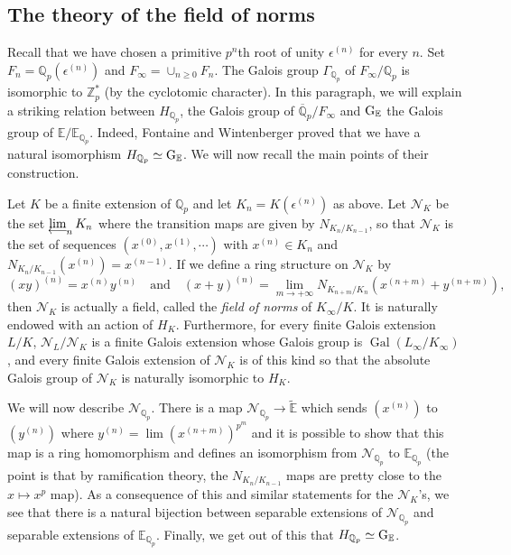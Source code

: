 \documentclass[11pt]{amsart}
\def\limproj{\mathop{\oalign{{\rm lim}\cr 
\hidewidth$\longleftarrow$\hidewidth\cr}}}
\def\Z{{\mathbb Z}_p}
\def\Q{{\mathbb Q}_p}
\def\ra{\rightarrow}
\def\Qp{{\mathbb Q}_p}
\def\ee{\mathbb{E}}
\def\ge{{\rm G}_{\ee}}
\def\et{\widetilde{\mathbb{E}}}
\def\on{\operatorname}
\begin{document}
\subsection{The theory of the field of norms} 
Recall that we have chosen a primitive $p^n$th root of unity 
$\epsilon^{(n)}$ for every $n$. Set $F_n=\Q(\epsilon^{(n)})$ and $F_{\infty} = 
\cup_{n \geq 0} F_n$. The Galois group $\Gamma_{\Q}$ of 
$F_{\infty}/\Qp$ is isomorphic to $\Z^*$ (by the cyclotomic 
character). In this paragraph, we will explain a striking relation 
between $H_{\Q}$, the Galois group of $\overline\Qp/F_\infty$ and 
$\ge$ the Galois group of $\ee/\ee_{\Q}$. Indeed, Fontaine and 
Wintenberger proved that we have a natural isomorphism $H_{\Q} \simeq 
\ge$. We will now recall the main points of their construction. 
  
Let $K$ be a finite extension of $\Q$ and let $K_n=K(\epsilon^{(n)})$ as 
above. Let 
$\mathcal{N}_K$ be the set $\limproj_n K_n$ where the transition maps are given by 
$N_{K_n/K_{n-1}}$, so that $\mathcal{N}_K$ is the set of sequences 
$(x^{(0)},x^{(1)},\cdots)$ with $x^{(n)} \in K_n$ and $N_{K_n/K_{n-1}}(x^{(n)}) = 
x^{(n-1)}$. If we define a ring structure on $\mathcal{N}_K$ by 
\[ (xy)^{(n)}= x^{(n)}y^{(n)} \quad\text{and}\quad 
(x+y)^{(n)}=\lim_{m \ra +\infty} N_{K_{n+m}/K_n}(x^{(n+m)}+y^{(n+m)}), \] 
then $\mathcal{N}_K$ is actually a field,  
called the \emph{field of norms} of $K_{\infty}/K$. It is 
naturally endowed with an action of $H_K$.  
Furthermore, for every finite Galois extension 
$L/K$, $\mathcal{N}_L/\mathcal{N}_K$ is a  
finite Galois extension whose Galois group is 
$\on{Gal}(L_{\infty}/K_{\infty})$, and every  
finite Galois extension of $\mathcal{N}_K$ is 
of this kind so that the absolute 
Galois group of $\mathcal{N}_K$ is naturally  
isomorphic to $H_K$. 
 
We will now describe $\mathcal{N}_{\Q}$.  
There is a 
map $\mathcal{N}_{\Q} \ra \et$ which sends $(x^{(n)})$ to $(y^{(n)})$ 
where $y^{(n)}=\lim (x^{(n+m)})^{p^m}$ and it is possible to show that 
this map is a ring homomorphism and  
defines an isomorphism from $\mathcal{N}_{\Q}$ to 
$\ee_{\Qp}$ (the point is that by ramification theory, the 
$N_{K_n/K_{n-1}}$ maps are pretty close to the $x \mapsto x^p$ map).  
As a consequence of this and similar statements for the 
$\mathcal{N}_K$'s, we see that there is a natural bijection between 
separable extensions of $\mathcal{N}_{\Q}$ and separable extensions of 
$\ee_{\Q}$. Finally, we get out of this that $H_{\Q} \simeq \ge$. 
 
\end{document}
